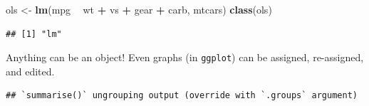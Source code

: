 \documentclass[
]{book}
\newenvironment{Shaded}{\begin{snugshade}}{\end{snugshade}}
\newcommand{\DataTypeTok}[1]{\textcolor[rgb]{0.13,0.29,0.53}{#1}}
\newcommand{\KeywordTok}[1]{\textcolor[rgb]{0.13,0.29,0.53}{\textbf{#1}}}
\newcommand{\NormalTok}[1]{#1}
\newcommand{\OperatorTok}[1]{\textcolor[rgb]{0.81,0.36,0.00}{\textbf{#1}}}
\newcommand{\StringTok}[1]{\textcolor[rgb]{0.31,0.60,0.02}{#1}}
\theoremstyle{definition}
\theoremstyle{definition}
\theoremstyle{definition}
\theoremstyle{definition}
\theoremstyle{remark}
\begin{document}
\begin{Shaded}
\begin{Highlighting}[]
\NormalTok{ols <-}\StringTok{ }\KeywordTok{lm}\NormalTok{(mpg }\OperatorTok{~}\StringTok{ }\NormalTok{wt }\OperatorTok{+}\StringTok{ }\NormalTok{vs }\OperatorTok{+}\StringTok{ }\NormalTok{gear }\OperatorTok{+}\StringTok{ }\NormalTok{carb, mtcars)}
\KeywordTok{class}\NormalTok{(ols)}
\end{Highlighting}
\end{Shaded}

\begin{verbatim}
## [1] "lm"
\end{verbatim}

Anything can be an object! Even graphs (in \texttt{ggplot}) can be assigned, re-assigned, and edited.

\begin{Shaded}
\end{Shaded}

\begin{verbatim}
## `summarise()` ungrouping output (override with `.groups` argument)
\end{verbatim}

\begin{Shaded}
\end{Shaded}
\end{document}

